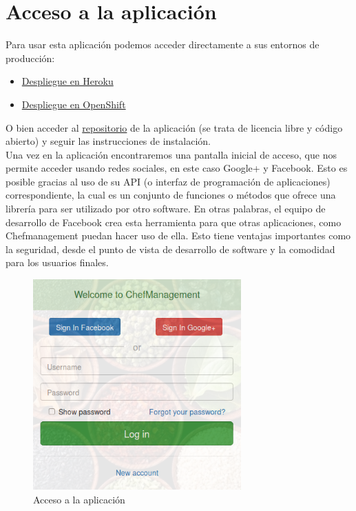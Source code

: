 \vspace*{0.2in}
\section{Acceso a la aplicación}\label{cap.2.1}

Para usar esta aplicación podemos acceder directamente a sus entornos de producción:
\begin{itemize}
	\item \href{http://chefmanagement.herokuapp.com/}{Despliegue en Heroku}
	\item \href{http://chefmanagement-esit.rhcloud.com/}{Despliegue en OpenShift}
\end{itemize}

O bien acceder al \href{https://github.com/alu0100207385/ChefManagement}{repositorio} de la aplicación (se trata de licencia libre y código abierto) y seguir las instrucciones de instalación. \\

Una vez en la aplicación encontraremos una pantalla inicial de acceso, que nos permite acceder usando redes sociales, en este caso Google+ y Facebook. Esto es posible gracias al uso de su API (o interfaz de programación de aplicaciones) correspondiente, la cual es un conjunto de funciones o métodos que ofrece una librería para ser utilizado por otro software. En otras palabras, el equipo de desarrollo de Facebook crea esta herramienta para que otras aplicaciones, como Chefmanagement puedan hacer uso de ella. Esto tiene ventajas importantes como la seguridad, desde el punto de vista de desarrollo de software y la comodidad para los usuarios finales. \\

\begin{figure}[H]
	\centering
	\includegraphics[width=8cm]{./images/chefmanagement-root.png}
	\caption{Acceso a la aplicación} \label{fig:chefmanagement-root}
\end{figure}


